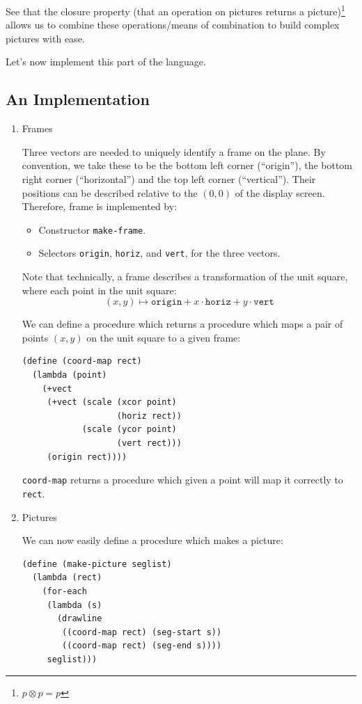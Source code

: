 \documentclass[9pt]{report}
\begin{document}
See that the closure property (that an operation on pictures
returns a picture)\footnote{\(p \otimes p = p\)} allows us to combine these operations/means of
combination to build complex pictures with ease.

Let's now implement this part of the language.

\subsection{An Implementation}
\label{sec:org6c65483}

\begin{enumerate}
\item Frames
\label{sec:orgff704b8}

Three vectors are needed to uniquely identify a frame on the
plane. By convention, we take these to be the bottom left corner
(``origin''), the bottom right corner (``horizontal'') and the top
left corner (``vertical''). Their positions can be described
relative to the \((0,0)\) of the display screen. Therefore,
frame is implemented by:
\begin{itemize}
\item Constructor \texttt{make-frame}.
\item Selectors \texttt{origin}, \texttt{horiz}, and \texttt{vert}, for the three vectors.
\end{itemize}

Note that technically, a frame describes a transformation of
the unit square, where each point in the unit square:
$$(x,y)\mapsto \mathtt{origin} + x\cdot \mathtt{horiz} + y\cdot
     \mathtt{vert}$$

We can define a procedure which returns a procedure which maps
a pair of points \((x,y)\) on the unit square to a given frame:

\begin{verbatim}
(define (coord-map rect)
  (lambda (point)
    (+vect
     (+vect (scale (xcor point)
                   (horiz rect))
            (scale (ycor point)
                   (vert rect)))
     (origin rect))))
\end{verbatim}

\texttt{coord-map} returns a procedure which given a point will map it
correctly to \texttt{rect}.

\item Pictures
\label{sec:org8de95ab}

We can now easily define a procedure which makes a picture:
\begin{verbatim}
(define (make-picture seglist)
  (lambda (rect)
    (for-each
     (lambda (s)
       (drawline
        ((coord-map rect) (seg-start s))
        ((coord-map rect) (seg-end s))))
     seglist)))
\end{verbatim}


\end{enumerate}
\end{document}
